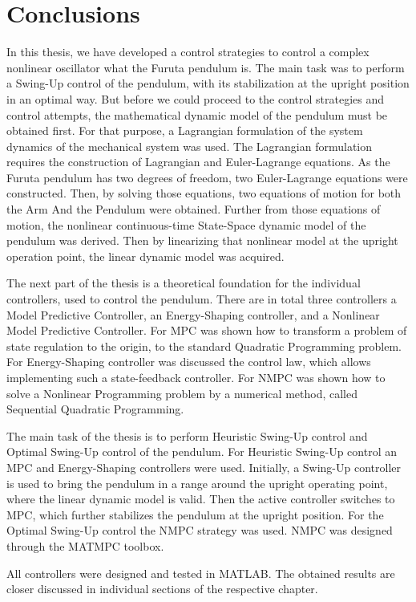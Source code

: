 \chapter{Conclusions}
In this thesis, we have developed a control strategies to control a complex nonlinear oscillator what the Furuta pendulum is. The main task was to perform a Swing-Up control of the pendulum, with its stabilization at the upright position in an optimal way. But before we could proceed to the control strategies and control attempts, the mathematical dynamic model of the pendulum must be obtained first. For that purpose, a Lagrangian formulation of the system dynamics of the mechanical system was used. The Lagrangian formulation requires the construction of Lagrangian and Euler-Lagrange equations. As the Furuta pendulum has two degrees of freedom, two Euler-Lagrange equations were constructed. Then, by solving those equations, two equations of motion for both the Arm And the Pendulum were obtained. Further from those equations of motion, the nonlinear continuous-time State-Space dynamic model of the pendulum was derived. Then by linearizing that nonlinear model at the upright operation point, the linear dynamic model was acquired.

The next part of the thesis is a theoretical foundation for the individual controllers, used to control the pendulum. There are in total three controllers a Model Predictive Controller, an Energy-Shaping controller, and a Nonlinear Model Predictive Controller. For MPC was shown how to transform a problem of state regulation to the origin, to the standard Quadratic Programming problem. For Energy-Shaping controller was discussed the control law, which allows implementing such a state-feedback controller. For NMPC was shown how to solve a Nonlinear Programming problem by a numerical method, called Sequential Quadratic Programming.

The main task of the thesis is to perform Heuristic Swing-Up control and Optimal Swing-Up control of the pendulum. For Heuristic Swing-Up control an MPC and Energy-Shaping controllers were used. Initially, a Swing-Up controller is used to bring the pendulum in a range around the upright operating point, where the linear dynamic model is valid. Then the active controller switches to MPC, which further stabilizes the pendulum at the upright position. For the Optimal Swing-Up control the NMPC strategy was used. NMPC was designed through the \textsc{MATMPC} toolbox.

All controllers were designed and tested in \textsc{MATLAB}. The obtained results are closer discussed in individual sections of the respective chapter.